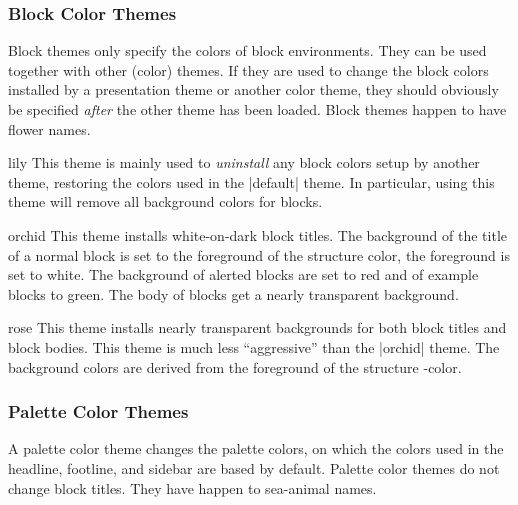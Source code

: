 \subsubsection{Block Color Themes}

Block themes only specify the colors of block environments. They can
be used together with other (color) themes. If they are used to change the
block colors installed by a presentation theme or another color theme,
they should obviously be specified \emph{after} the other theme has
been loaded. Block themes happen to have flower names.

\begin{colorthemeexample}{lily}
  This theme is mainly used to \emph{uninstall} any block colors setup
  by another theme, restoring the colors used in the |default|
  theme. In particular, using this theme will remove all background
  colors for blocks.
\end{colorthemeexample}

\begin{colorthemeexample}{orchid}
  This theme installs white-on-dark block titles. The background of
  the title of a normal block is set to the foreground of the
  structure color, the foreground is set to white. The background of
  alerted blocks are set to red and of example blocks to green. The
  body of blocks get a nearly transparent background.
\end{colorthemeexample}

\begin{colorthemeexample}{rose}
  This theme installs nearly transparent backgrounds for both block
  titles and block bodies. This theme is much less ``aggressive'' than
  the |orchid| theme. The background colors are derived from the
  foreground of the structure \beamer-color.
\end{colorthemeexample}


\subsubsection{Palette Color Themes}

A palette color theme  changes the palette colors, on which the colors
used in the headline, footline, and sidebar 
are based by default. Palette color themes do not change block
titles. They have happen to sea-animal names.


